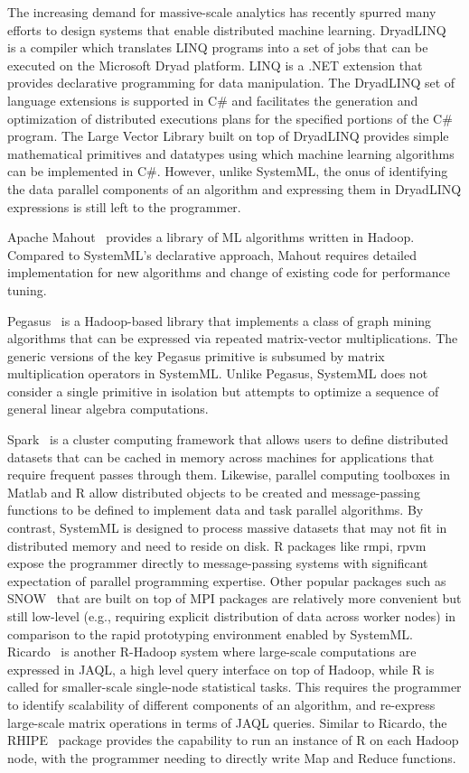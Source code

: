 The increasing demand for massive-scale analytics has recently spurred many efforts to design
systems that enable distributed machine learning. 
DryadLINQ~\cite{DryadLinq2008} is a compiler which
translates LINQ programs into a set of jobs that can be executed on the Microsoft Dryad
platform. LINQ is a .NET extension that provides declarative programming for data manipulation. 
The DryadLINQ set of language extensions is supported in C\# and facilitates the
generation and optimization of distributed executions plans for the specified portions of the C\# program. The Large
Vector Library built on top of DryadLINQ provides simple mathematical primitives and datatypes using
which machine learning algorithms can be implemented in C\#. However, unlike
SystemML, the onus of identifying the data parallel components of an algorithm and expressing them in DryadLINQ
expressions is still left to the programmer.

Apache Mahout~\cite{mahout} provides a library of ML algorithms written in Hadoop. Compared to SystemML's declarative approach, Mahout requires detailed implementation for new algorithms and change of existing code for performance tuning.

Pegasus~\cite{pegasusICDM2009} is a Hadoop-based library that implements a class of graph mining algorithms that can be expressed via repeated matrix-vector multiplications. The generic versions of the key Pegasus primitive is subsumed by matrix multiplication operators in SystemML. Unlike Pegasus, SystemML does not consider a single primitive in isolation but attempts to optimize a sequence of general linear algebra computations.  
  
Spark~\cite{Zaharia:EECS-2010-53} is a cluster computing framework that allows users to define distributed datasets that can be cached in memory across machines for applications that require frequent passes through them. Likewise, parallel computing toolboxes in Matlab and R allow distributed objects to be created and message-passing functions to be defined to implement data and task parallel algorithms. By contrast, SystemML is designed to process massive datasets that may not fit in distributed memory and need to reside on disk.  R packages like rmpi, rpvm expose the programmer directly to message-passing systems with significant expectation of parallel programming expertise. Other popular packages such as SNOW~\cite{snow} that are built on top of MPI packages are relatively more convenient but still low-level (e.g., requiring explicit distribution of data across worker nodes) in comparison to the rapid prototyping environment enabled by SystemML. Ricardo~\cite{ricardo} is another R-Hadoop system where large-scale computations are expressed in JAQL, a high level query interface on top of Hadoop, while R is called for smaller-scale single-node statistical tasks. This requires the programmer to identify scalability of different components of an algorithm, and re-express large-scale matrix operations in terms of JAQL queries. Similar to Ricardo, the RHIPE~\cite{rhipe} package provides the capability to run an instance of R on each Hadoop node, with the programmer needing to directly write Map and Reduce functions.  


